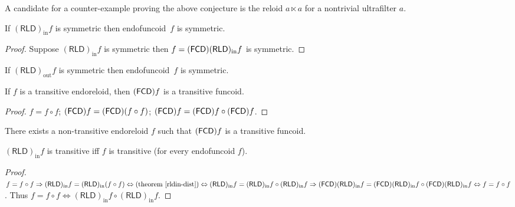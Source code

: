 A candidate for a counter-example proving the above conjecture is the reloid
$a \ltimes a$ for a nontrivial ultrafilter $a$.

\begin{prop}
  If $(\mathsf{RLD})_{\operatorname{in}} f$ is symmetric then endofuncoid~$f$
  is symmetric.
\end{prop}

\begin{proof}
  Suppose $(\mathsf{RLD})_{\operatorname{in}} f$ is symmetric then $f =
  (\mathsf{FCD}) (\mathsf{RLD})_{\operatorname{in}} f$ is symmetric.
\end{proof}

\begin{conjecture}
  If $(\mathsf{RLD})_{\operatorname{out}} f$ is symmetric then endofuncoid~$f$
  is symmetric.
\end{conjecture}

\begin{prop}
  If $f$ is a transitive endoreloid, then $(\mathsf{FCD}) f$ is a
  transitive funcoid.
\end{prop}

\begin{proof}
  $f = f \circ f$; $(\mathsf{FCD}) f = (\mathsf{FCD}) (f \circ
  f)$; $(\mathsf{FCD}) f = (\mathsf{FCD}) f \circ
  (\mathsf{FCD}) f$.
\end{proof}

\begin{conjecture}
  There exists a non-transitive endoreloid $f$ such that
  $(\mathsf{FCD}) f$ is a transitive funcoid.
\end{conjecture}

\begin{prop}
  $(\mathsf{RLD})_{\operatorname{in}} f$ is transitive iff $f$ is transitive
  (for every endofuncoid $f$).
\end{prop}

\begin{proof}
  $f = f \circ f \Rightarrow (\mathsf{RLD})_{\operatorname{in}} f =
  (\mathsf{RLD})_{\operatorname{in}} (f \circ f) \Leftrightarrow \text{(theorem~\ref{rldin-dist})} \Leftrightarrow
  (\mathsf{RLD})_{\operatorname{in}} f =
  (\mathsf{RLD})_{\operatorname{in}} f \circ (\mathsf{RLD})_{\operatorname{in}}
  f \Rightarrow (\mathsf{FCD}) (\mathsf{RLD})_{\operatorname{in}} f =
  (\mathsf{FCD}) (\mathsf{RLD})_{\operatorname{in}} f \circ
  (\mathsf{FCD}) (\mathsf{RLD})_{\operatorname{in}} f \Leftrightarrow f
  = f \circ f$. Thus $f = f \circ f \Leftrightarrow
  (\mathsf{RLD})_{\operatorname{in}} f \circ (\mathsf{RLD})_{\operatorname{in}}
  f$.
\end{proof}

